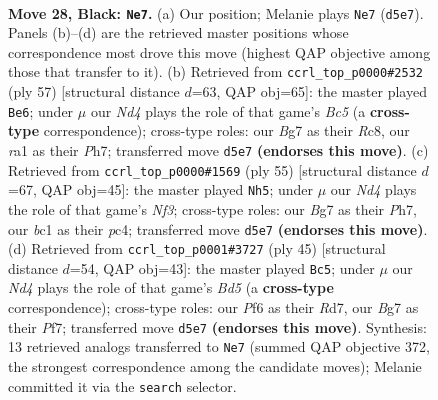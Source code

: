 \documentclass[11pt]{article}
\begin{document}
\clearpage

\begin{figure}[p]\centering
\begin{subfigure}{0.46\textwidth}\centering
\resizebox{\linewidth}{!}{%
\newchessgame
\chessboard[
  setfen={r5k1/p1r3bp/PpP2p2/3n1R2/4pPP1/8/4B3/R1B1K3 b Q - 0 28},
  showmover=false,
  pgfstyle=straightmove, color=movearrow, markmove={d5-e7}
]}
\caption{}
\end{subfigure}\hfill
\begin{subfigure}{0.46\textwidth}\centering
\resizebox{\linewidth}{!}{%
\newchessgame
\chessboard[
  setfen={2r3k1/p2r1ppp/1p3n2/8/R1bB3P/2P3P1/P4PB1/4R1K1 b - - 0 29},
  showmover=false,
  pgfstyle=straightmove, color=movearrow, markmove={c4-e6}
]}
\caption{}
\end{subfigure}
\\[4pt]
\begin{subfigure}{0.46\textwidth}\centering
\resizebox{\linewidth}{!}{%
\newchessgame
\chessboard[
  setfen={4r2k/7p/1p1R1n2/pPp1ppr1/2P5/5PP1/1P2B3/1K4R1 b - - 0 28},
  showmover=false,
  pgfstyle=straightmove, color=movearrow, markmove={f6-h5}
]}
\caption{}
\end{subfigure}\hfill
\begin{subfigure}{0.46\textwidth}\centering
\resizebox{\linewidth}{!}{%
\newchessgame
\chessboard[
  setfen={8/p2r1pkp/1rnpp3/8/2BbP3/7P/RP3PP1/2BR2K1 b - - 2 23},
  showmover=false,
  pgfstyle=straightmove, color=movearrow, markmove={d4-c5}
]}
\caption{}
\end{subfigure}
\caption{\textbf{Move 28, Black: \texttt{Ne7}.} (a) Our position; Melanie plays \texttt{Ne7} (\texttt{d5e7}). Panels (b)--(d) are the retrieved master positions whose correspondence most drove this move (highest QAP objective among those that transfer to it). (b) Retrieved from \texttt{ccrl\_top\_p0000\#2532} (ply 57) [structural distance $d$=63, QAP obj=65]: the master played \texttt{Be6}; under $\mu$ our \emph{Nd4} plays the role of that game's \emph{Bc5} (a \textbf{cross-type} correspondence); cross-type roles: our \emph{B}g7 as their \emph{R}c8, our \emph{r}a1 as their \emph{P}h7; transferred move \texttt{d5e7} \textbf{(endorses this move)}. (c) Retrieved from \texttt{ccrl\_top\_p0000\#1569} (ply 55) [structural distance $d$=67, QAP obj=45]: the master played \texttt{Nh5}; under $\mu$ our \emph{Nd4} plays the role of that game's \emph{Nf3}; cross-type roles: our \emph{B}g7 as their \emph{P}h7, our \emph{b}c1 as their \emph{p}c4; transferred move \texttt{d5e7} \textbf{(endorses this move)}. (d) Retrieved from \texttt{ccrl\_top\_p0001\#3727} (ply 45) [structural distance $d$=54, QAP obj=43]: the master played \texttt{Bc5}; under $\mu$ our \emph{Nd4} plays the role of that game's \emph{Bd5} (a \textbf{cross-type} correspondence); cross-type roles: our \emph{P}f6 as their \emph{R}d7, our \emph{B}g7 as their \emph{P}f7; transferred move \texttt{d5e7} \textbf{(endorses this move)}. Synthesis: 13 retrieved analogs transferred to \texttt{Ne7} (summed QAP objective 372, the strongest correspondence among the candidate moves); Melanie committed it via the \texttt{search} selector.}
\label{fig:thought-m55}
\end{figure}
\end{document}
